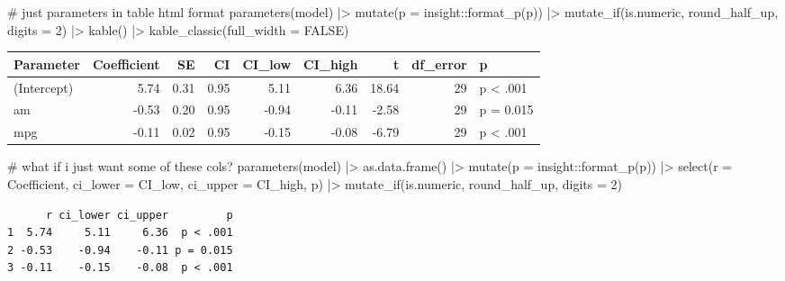 \documentclass[
  letterpaper,
  DIV=11,
  numbers=noendperiod]{scrreprt}
\newenvironment{Shaded}{\begin{snugshade}}{\end{snugshade}}
\newcommand{\AttributeTok}[1]{\textcolor[rgb]{0.40,0.45,0.13}{#1}}
\newcommand{\CommentTok}[1]{\textcolor[rgb]{0.37,0.37,0.37}{#1}}
\newcommand{\ConstantTok}[1]{\textcolor[rgb]{0.56,0.35,0.01}{#1}}
\newcommand{\DecValTok}[1]{\textcolor[rgb]{0.68,0.00,0.00}{#1}}
\newcommand{\FunctionTok}[1]{\textcolor[rgb]{0.28,0.35,0.67}{#1}}
\newcommand{\NormalTok}[1]{\textcolor[rgb]{0.00,0.23,0.31}{#1}}
\newcommand{\SpecialCharTok}[1]{\textcolor[rgb]{0.37,0.37,0.37}{#1}}
\begin{document}
\begin{Shaded}
\begin{Highlighting}[]
\CommentTok{\# just parameters in table html format }
\FunctionTok{parameters}\NormalTok{(model) }\SpecialCharTok{|\textgreater{}}
  \FunctionTok{mutate}\NormalTok{(}\AttributeTok{p =}\NormalTok{ insight}\SpecialCharTok{::}\FunctionTok{format\_p}\NormalTok{(p)) }\SpecialCharTok{|\textgreater{}}
  \FunctionTok{mutate\_if}\NormalTok{(is.numeric, round\_half\_up, }\AttributeTok{digits =} \DecValTok{2}\NormalTok{) }\SpecialCharTok{|\textgreater{}}
  \FunctionTok{kable}\NormalTok{() }\SpecialCharTok{|\textgreater{}}
  \FunctionTok{kable\_classic}\NormalTok{(}\AttributeTok{full\_width =} \ConstantTok{FALSE}\NormalTok{)}
\end{Highlighting}
\end{Shaded}

\begin{longtable*}[t]{lrrrrrrrl}
\toprule
Parameter & Coefficient & SE & CI & CI\_low & CI\_high & t & df\_error & p\\
\midrule
(Intercept) & 5.74 & 0.31 & 0.95 & 5.11 & 6.36 & 18.64 & 29 & p < .001\\
am & -0.53 & 0.20 & 0.95 & -0.94 & -0.11 & -2.58 & 29 & p = 0.015\\
mpg & -0.11 & 0.02 & 0.95 & -0.15 & -0.08 & -6.79 & 29 & p < .001\\
\bottomrule
\end{longtable*}

\begin{Shaded}
\begin{Highlighting}[]
\CommentTok{\# what if i just want some of these cols?}
\FunctionTok{parameters}\NormalTok{(model) }\SpecialCharTok{|\textgreater{}}
  \FunctionTok{as.data.frame}\NormalTok{() }\SpecialCharTok{|\textgreater{}}
  \FunctionTok{mutate}\NormalTok{(}\AttributeTok{p =}\NormalTok{ insight}\SpecialCharTok{::}\FunctionTok{format\_p}\NormalTok{(p)) }\SpecialCharTok{|\textgreater{}}
  \FunctionTok{select}\NormalTok{(}\AttributeTok{r =}\NormalTok{ Coefficient, }\AttributeTok{ci\_lower =}\NormalTok{ CI\_low, }\AttributeTok{ci\_upper =}\NormalTok{ CI\_high, p) }\SpecialCharTok{|\textgreater{}}
  \FunctionTok{mutate\_if}\NormalTok{(is.numeric, round\_half\_up, }\AttributeTok{digits =} \DecValTok{2}\NormalTok{)}
\end{Highlighting}
\end{Shaded}

\begin{verbatim}
      r ci_lower ci_upper         p
1  5.74     5.11     6.36  p < .001
2 -0.53    -0.94    -0.11 p = 0.015
3 -0.11    -0.15    -0.08  p < .001
\end{verbatim}
\end{document}
